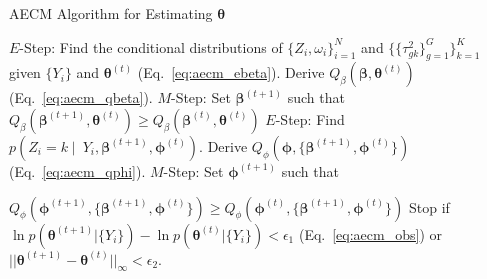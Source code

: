 \begin{algorithm}[!t]
	\caption{AECM Algorithm for Estimating $\bm{\theta}$}
	\label{alg:main}
	\begin{algorithmic}
		
		 $E$-Step: Find the conditional distributions of $\{Z_i, \omega_i\}_{i=1}^N$ and $\{\{\tau^2_{gk}\}_{g=1}^G\}_{k=1}^K$ given $\{Y_i\}$ and $\bm{\theta}^{(t)}$ (Eq.~\eqref{eq:aecm_ebeta}). Derive $Q_\beta(\bm{\beta}, \bm{\theta}^{(t)})$ (Eq.~\eqref{eq:aecm_qbeta}).
		 $M$-Step: Set $\bm{\beta}^{(t+1)}$ such that $Q_\beta(\bm{\beta}^{(t+1)}, \bm{\theta}^{(t)}) \geq Q_\beta(\bm{\beta}^{(t)}, \bm{\theta}^{(t)})$ 
		 $E$-Step: Find $p(Z_i=k\mid~Y_i, \bm{\beta}^{(t+1)}, \bm{\phi}^{(t)})$. Derive $Q_\phi(\bm{\phi}, \{\bm{\beta}^{(t+1)}, \bm{\phi}^{(t)}\})$ (Eq.~\eqref{eq:aecm_qphi}). 
		 $M$-Step: Set $\bm{\phi}^{(t+1)}$ such that 
		
		$Q_\phi(\bm{\phi}^{(t+1)}, \{\bm{\beta}^{(t+1)}, \bm{\phi}^{(t)}\}) \geq Q_\phi(\bm{\phi}^{(t)}, \{\bm{\beta}^{(t+1)}, \bm{\phi}^{(t)}\})$
		 Stop if $\ln p(\bm{\theta}^{(t+1)} | \{Y_i\}) - \ln p(\bm{\theta}^{(t)} | \{Y_i\}) < \epsilon_1$ (Eq.~\eqref{eq:aecm_obs}) or $||\bm{\theta}^{(t+1)} - \bm{\theta}^{(t)}||_\infty < \epsilon_2$.
		\EndFor
	\end{algorithmic}
\end{algorithm}

